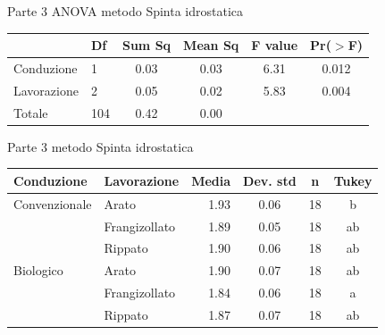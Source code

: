 \documentclass[10pt]{beamer}
\begin{document}
\begin{frame}{Parte 3 \small{ ANOVA metodo Spinta idrostatica}}
  \begin{table}
    \centering
    \begin{tabular}{llcccc}
      \hline
      & Df  & Sum Sq & Mean Sq & F value & Pr($>$F) \\ 
      \hline
      Conduzione  & 1   & 0.03   & 0.03    & 6.31    & 0.012    \\ 
      Lavorazione & 2   & 0.05   & 0.02    & 5.83    & 0.004    \\ 
      Totale      & 104 & 0.42   & 0.00    &         &          \\ 
      \hline
    \end{tabular}
    \label{tab:Anova densita per spinta}
  \end{table}

\end{frame}

\begin{frame}{Parte 3 \small{ metodo Spinta idrostatica}}

  \footnotesize
  \begin{table}[ht]
    \centering
    \begin{tabular}{llrccc}
      \hline
      Conduzione    & Lavorazione   & Media& Dev. std & n    & Tukey \\ 
      \hline
      Convenzionale & Arato         & 1.93 & 0.06      &  18 & b     \\ 
                    & Frangizollato & 1.89 & 0.05      &  18 & ab    \\ 
                    & Rippato       & 1.90 & 0.06      &  18 & ab    \\ 
      Biologico     & Arato         & 1.90 & 0.07      &  18 & ab    \\ 
                    & Frangizollato & 1.84 & 0.06      &  18 & a     \\ 
                    & Rippato       & 1.87 & 0.07      &  18 & ab    \\ 
      \hline
    \end{tabular}
    \label{tab:RiassuntoDensitaSpinta}
  \end{table}
\end{frame}
\end{document}

